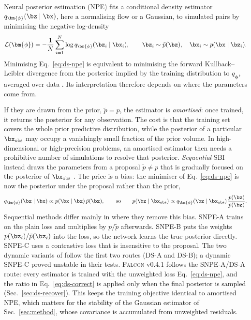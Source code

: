 Neural posterior estimation (NPE) fits a conditional density estimator
$q_{\bm{\phi}}(\bz\mid\bx)$, here a normalising flow or a Gaussian, to
simulated pairs by minimising the negative log-density
\begin{equation}
    \mathcal{L}(\bm{\phi})=-\frac{1}{N}\sum_{i=1}^{N}\log q_{\bm{\phi}}(\bz_i\mid\bx_i),
    \qquad \bz_i\sim\tilde p(\bz),\quad \bx_i\sim p(\bx\mid\bz_i).
    \label{eq:ds-npe}
\end{equation}
Minimising Eq.~\eqref{eq:ds-npe} is equivalent to minimising the forward
Kullback--Leibler divergence from the posterior implied by the training
distribution to $q_{\bm{\phi}}$, averaged over data
\citep{papamakarios_fast_2016,greenberg_automatic_2019}. Its interpretation
therefore depends on where the parameters come from.

If they are drawn from the prior, $\tilde p=p$, the estimator is
\emph{amortised}: once trained, it returns the posterior for any observation.
The cost is that the training set covers the whole prior predictive
distribution, while the posterior of a particular $\bx_{\mathrm{obs}}$ may
occupy a vanishingly small fraction of the prior volume. In high-dimensional
or high-precision problems, an amortised estimator then needs a prohibitive
number of simulations to resolve that posterior. \emph{Sequential} SBI instead
draws the parameters from a proposal $\tilde p\neq p$ that is gradually
focused on the posterior of $\bx_{\mathrm{obs}}$
\citep{papamakarios_fast_2016,lueckmann_flexible_2017,greenberg_automatic_2019,deistler_truncated_nodate}.
The price is a bias: the minimiser of Eq.~\eqref{eq:ds-npe} is now the
posterior under the proposal rather than the prior,
\begin{equation}
    q_{\bm{\phi}}(\bz\mid\bx)\propto p(\bx\mid\bz)\,\tilde p(\bz),
    \qquad\text{so}\qquad
    p(\bz\mid\bx_{\mathrm{obs}})\propto q_{\bm{\phi}}(\bz\mid\bx_{\mathrm{obs}})\,\frac{p(\bz)}{\tilde p(\bz)} .
    \label{eq:ds-correct}
\end{equation}
Sequential methods differ mainly in where they remove this bias. SNPE-A
\citep{papamakarios_fast_2016} trains on the plain loss and multiplies by
$p/\tilde p$ afterwards. SNPE-B \citep{lueckmann_flexible_2017} puts the
weights $p(\bz_i)/\tilde p(\bz_i)$ into the loss, so the network learns the
true posterior directly. SNPE-C \citep{greenberg_automatic_2019} uses a
contrastive loss that is insensitive to the proposal. The two dynamic variants
of \citet{lyu_dynamic_2026} follow the first two routes (DS-A and DS-B); a
dynamic SNPE-C proved unstable in their tests. \textsc{Falcon} v0.4.1 follows
the SNPE-A/DS-A route: every estimator is trained with the unweighted loss
Eq.~\eqref{eq:ds-npe}, and the ratio in Eq.~\eqref{eq:ds-correct} is applied
only when the final posterior is sampled (Sec.~\ref{sec:ds-recover}). This
keeps the training objective identical to amortised NPE, which matters for
the stability of the Gaussian estimator of Sec.~\ref{sec:method}, whose
covariance is accumulated from unweighted residuals.

